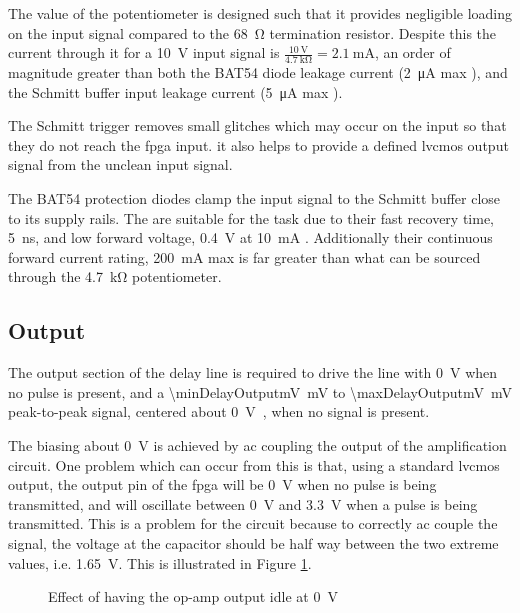 The value of the potentiometer is designed such that it provides negligible loading on the input signal compared to the \SI{68}{\ohm} termination resistor. Despite this the current through it for a \SI{10}{\volt} input signal is $\frac{\SI{10}{\volt}}{\SI{4.7}{\kilo\ohm}} = \SI{2.1}{\milli\ampere}$, an order of magnitude greater than both the BAT54 diode leakage current (\SI{2}{\micro\ampere} max \cite[p.2]{vishay2013}), and the Schmitt buffer input leakage current (\SI{5}{\micro\ampere} max \cite[p.4]{diodesinc2014}).

The Schmitt trigger removes small glitches which may occur on the input so that they do not reach the \gls{fpga} input. it also helps to provide a defined \gls{lvcmos} output signal from the unclean input signal.

The BAT54 protection diodes clamp the input signal to the Schmitt buffer close to its supply rails. The are suitable for the task due to their fast recovery time, \SI{5}{\nano\second}, and low forward voltage, \SI{0.4}{\volt} at \SI{10}{\milli\ampere} \cite[p.2]{vishay2013}. Additionally their continuous forward current rating, \SI{200}{\milli\ampere} max is far greater than what can be sourced through the \SI{4.7}{\kilo\ohm} potentiometer.

\subsection{Output} \label{sec:delay-line-ana-output}

The output section of the delay line is required to drive the line with \SI{0}{\volt} when no pulse is present, and a \SI{\minDelayOutputmV}{\milli\volt} to \SI{\maxDelayOutputmV}{\milli\volt} peak-to-peak signal, centered about \SI{0}{\volt,} when no signal is present.


The biasing about \SI{0}{\volt} is achieved by \gls{ac} coupling the output of the amplification circuit. One problem which can occur from this is that, using a standard \gls{lvcmos} output, the output pin of the \gls{fpga} will be \SI{0}{\volt} when no pulse is being transmitted, and will oscillate between \SI{0}{\volt} and \SI{3.3}{\volt} when a pulse is being transmitted. This is a problem for the circuit because to correctly \gls{ac} couple the signal, the voltage at the capacitor should be half way between the two extreme values, i.e. \SI{1.65}{\volt}. This is illustrated in Figure \ref{fig:delay-line-output-coupling}.

\begin{figure}[ht]
	\centering
	\dummyfigure
	\caption{Effect of having the op-amp output idle at \SI{0}{\volt}}
	\label{fig:delay-line-output-coupling}
\end{figure}

